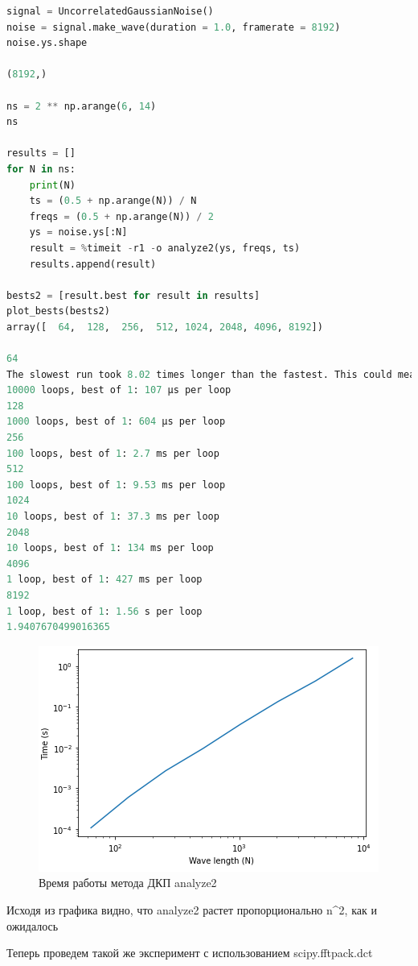 \begin{lstlisting}[language=Python]
signal = UncorrelatedGaussianNoise()
noise = signal.make_wave(duration = 1.0, framerate = 8192)
noise.ys.shape

(8192,)

ns = 2 ** np.arange(6, 14)
ns

results = []
for N in ns:
    print(N)
    ts = (0.5 + np.arange(N)) / N
    freqs = (0.5 + np.arange(N)) / 2
    ys = noise.ys[:N]
    result = %timeit -r1 -o analyze2(ys, freqs, ts)
    results.append(result)

bests2 = [result.best for result in results]
plot_bests(bests2)
array([  64,  128,  256,  512, 1024, 2048, 4096, 8192])

64
The slowest run took 8.02 times longer than the fastest. This could mean that an intermediate result is being cached.
10000 loops, best of 1: 107 µs per loop
128
1000 loops, best of 1: 604 µs per loop
256
100 loops, best of 1: 2.7 ms per loop
512
100 loops, best of 1: 9.53 ms per loop
1024
10 loops, best of 1: 37.3 ms per loop
2048
10 loops, best of 1: 134 ms per loop
4096
1 loop, best of 1: 427 ms per loop
8192
1 loop, best of 1: 1.56 s per loop
1.9407670499016365
\end{lstlisting}

\begin{figure}[H]
	\begin{center}
		\includegraphics[scale=1]{fig/lab06/lab06_02.png}
		\caption{Время работы метода ДКП analyze2}
	\end{center}
\end{figure}

Исходя из графика видно, что analyze2 растет пропорционально n^2, как и ожидалось

Теперь проведем такой же эксперимент с использованием scipy.fftpack.dct

